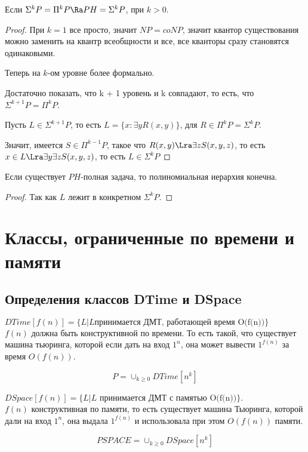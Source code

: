 \begin{theorem}
	Если $\Sigma^k P = \Pi^k P \Ra PH = \Sigma^kP$, при $k > 0$. 
\end{theorem}
\begin{proof}
	При $k = 1$ все просто, значит $NP = coNP$, значит квантор существования можно заменить на квантр всеобщности и все,
	все кванторы сразу становятся одинаковыми.

	Теперь на $k$-ом уровне более формально.
	
	Достаточно показать, что k + 1 уровень и k совпадают, то есть, что $\Sigma^{k + 1}P = \Pi^kP$.

	Пусть $L \in \Sigma^{k + 1}P$, то есть $L = \{x \colon \exists y R(x, y)\}$, для $R \in \Pi^k P = \Sigma^k P$.

	Значит, имеется $S \in \Pi^{k - 1}P$, такое что $R(x, y) \Lra \exists z S(x, y, z)$, то есть
	$x \in L \Lra \exists y \exists z S(x,y, z)$, то есть $L \in \Sigma^{k}P$ 
\end{proof}

\begin{conseq}
	Если существует $PH$-полная задача, то полиномиальная иерархия конечна. 
\end{conseq}

\begin{proof}
	Так как $L$ лежит в конкретном $\Sigma^k P$.
\end{proof}

\section{Классы, ограниченные по времени и памяти}
\subsection{Определения классов DTime и DSpace}
\begin{Def}
	$DTime[f(n)] = \{L| L\text{принимается ДМТ, работающей время O(f(n))}\}$\\
	$f(n)$ должна быть конструктивной по времени. То есть такой, что 
	существует машина тьюринга, которой если дать на вход $1^n$, она 
	может вывести $1^{f(n)}$ за время $O(f(n))$.
\end{Def}

\begin{Rem}
	$$P = \cup_{k \ge 0}DTime[n^k]$$
\end{Rem}

\begin{Def}
	$DSpace[f(n)] = \{L|L\text{ принимается ДМТ с памятью O(f(n))}\}$.\\
	$f(n)$ конструктивная по памяти, то есть существует машина Тьюринга, которой дали на вход $1^n$, 
	она выдала $1^{f(n)}$ и использовала при этом $O(f(n))$ памяти.
\end{Def}
\begin{Def}
	$$PSPACE = \cup_{k \ge 0}DSpace[n^k]$$
\end{Def}

